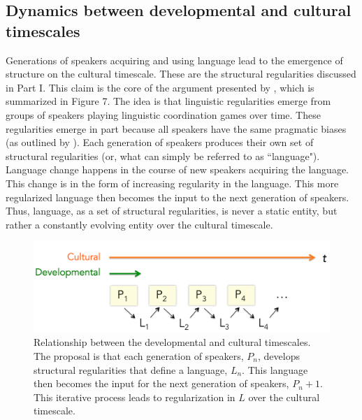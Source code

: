 \documentclass[man, noapacite, 12pt]{apa2}
\begin{document}
\subsection{Dynamics between developmental and cultural timescales}

Generations of speakers acquiring and using language lead to the emergence of structure on the cultural timescale. These are the structural regularities discussed in Part I. This claim is the core of the argument presented by , which is summarized in Figure 7. The idea is that linguistic regularities emerge from groups of speakers playing linguistic coordination games over time. These regularities emerge in part because all speakers have the same pragmatic biases (as outlined by ). Each generation of speakers produces their own set of structural regularities (or, what can simply be referred to as ``language"). Language change happens in the course of new speakers acquiring the language. This change is in the form of increasing regularity in the language. This more regularized language then becomes the input to the next generation of speakers. Thus, language, as a set of structural regularities,  is never a static entity, but rather a constantly evolving entity over the cultural timescale. 

\begin{figure}
\begin{center} 
\includegraphics[width=6in]{figs/timescales2}
\caption{Relationship between the developmental and cultural timescales. The proposal is that each generation of speakers, $P_n$, develops structural regularities that define a language, $L_n$. This language then becomes the input for the next generation of speakers, $P_n+1$. This iterative process leads to regularization in $L$ over the cultural timescale. }
\end{center} 
\end{figure}
\end{document}
